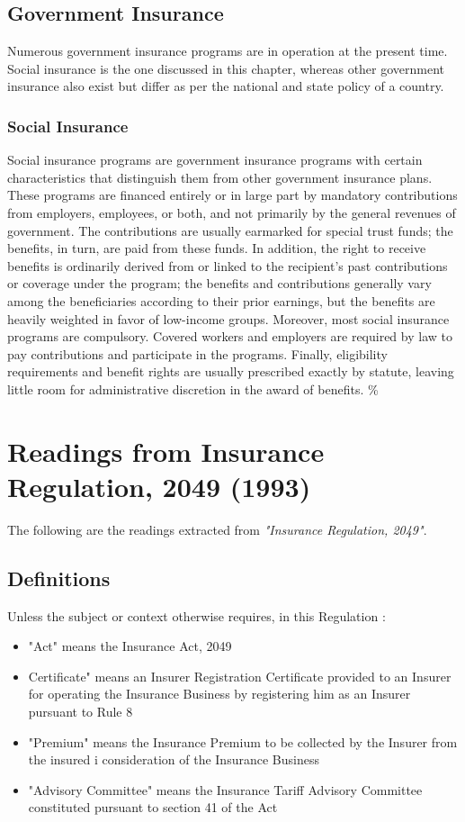 \subsection{Government Insurance}
Numerous government insurance programs are in operation at the present time. Social insurance is the one discussed in this chapter, whereas other government insurance also exist but differ as per the national and state policy of a country.
%
\subsubsection{Social Insurance}
Social insurance programs are government insurance programs with certain characteristics that distinguish them from other government insurance plans. These programs are financed entirely or in large part by mandatory contributions from employers, employees, or both, and not primarily by the general revenues of government. The contributions are usually earmarked for special trust funds; the benefits, in turn, are paid from these funds. In addition, the right to receive benefits is ordinarily derived from or linked to the recipient’s past contributions or coverage under the program; the benefits and contributions generally vary among the beneficiaries according to their prior earnings, but the benefits are heavily weighted in favor of low-income groups. Moreover, most social insurance programs are compulsory. Covered workers and employers are required by law to pay contributions and participate in the programs. Finally, eligibility requirements and benefit rights are usually prescribed exactly by statute, leaving little room for administrative discretion in the award of benefits.
\%
\section{Readings from Insurance Regulation, 2049 (1993)}
The following are the readings extracted from \textit{"Insurance Regulation, 2049"}.
\subsection{Definitions}
Unless the subject or context otherwise requires, in this Regulation :
\begin{itemize}
	\item  "Act" means the Insurance Act, 2049
	\item Certificate" means an Insurer Registration Certificate provided to an Insurer for
	operating the Insurance Business by registering him as an Insurer pursuant to Rule 8
	\item "Premium" means the Insurance Premium to be collected by the Insurer from the insured i consideration of the Insurance Business
	\item "Advisory Committee" means the Insurance Tariff Advisory Committee constituted
	pursuant to section 41 of the Act
\end{itemize}
%
